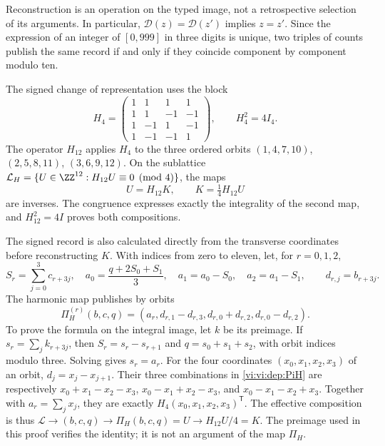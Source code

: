 Reconstruction is an operation on the typed image, not a
retrospective selection of its arguments. In particular,
\(\mathcal D(z)=\mathcal D(z')\) implies \(z=z'\).
Since the expression of an integer of \([0,999]\) in three digits is unique,
two triples of counts publish the same record if and only if they coincide
component by component modulo ten.

The signed change of representation uses the block
\begin{equation}
 H_4=\begin{pmatrix}
 1&1&1&1\\1&1&-1&-1\\
 1&-1&1&-1\\1&-1&-1&1
 \end{pmatrix},\qquad H_4^2=4I_4.
 \label{vi:vi:dep:hadamard}
\end{equation}
The operator \(H_{12}\) applies \(H_4\) to the three ordered orbits
\((1,4,7,10)\), \((2,5,8,11)\), \((3,6,9,12)\).
On the sublattice
\(\mathcal L_H=\{U\in\ZZ^{12}:H_{12}U\equiv0\pmod4\}\),
the maps
\begin{equation}
 U=H_{12}K,\qquad K=\tfrac14H_{12}U
 \label{vi:vi:dep:K-reversible}
\end{equation}
are inverses. The congruence expresses exactly the integrality of the
second map, and \(H_{12}^2=4I\) proves both compositions.

The signed record is also calculated directly from the transverse
coordinates before reconstructing \(K\). With indices from zero to eleven,
let, for \(r=0,1,2\),
\[
 S_r=\sum_{j=0}^3c_{r+3j},\quad
 a_0=\frac{q+2S_0+S_1}{3},\quad
 a_1=a_0-S_0,\quad a_2=a_1-S_1,
 \qquad d_{r,j}=b_{r+3j}.
\]
The harmonic map publishes by orbits
\begin{equation}
 \Pi_H^{(r)}(b,c,q)=
 (a_r,d_{r,1}-d_{r,3},d_{r,0}+d_{r,2},d_{r,0}-d_{r,2}).
 \label{vi:vi:dep:PiH}
\end{equation}
To prove the formula on the integral image, let \(k\) be its
preimage. If \(s_r=\sum_jk_{r+3j}\), then
\(S_r=s_r-s_{r+1}\) and \(q=s_0+s_1+s_2\), with orbit indices
modulo three. Solving gives \(s_r=a_r\). For the four coordinates
\((x_0,x_1,x_2,x_3)\) of an orbit,
\(d_j=x_j-x_{j+1}\). Their three combinations in
\eqref{vi:vi:dep:PiH} are respectively
\(x_0+x_1-x_2-x_3\), \(x_0-x_1+x_2-x_3\), and
\(x_0-x_1-x_2+x_3\). Together with \(a_r=\sum_jx_j\), they are
exactly \(H_4(x_0,x_1,x_2,x_3)^{\mathsf T}\).
The effective composition is thus
\(\mathscr L\to(b,c,q)\to\Pi_H(b,c,q)=U\to H_{12}U/4=K\).
The preimage used in this proof verifies the identity;
it is not an argument of the map \(\Pi_H\).

